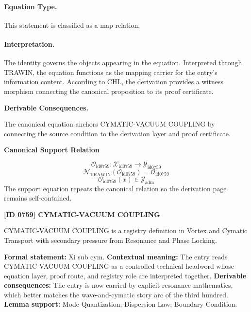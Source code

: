 \paragraph{Equation Type.}
This statement is classified as a map relation.

\paragraph{Interpretation.}
The identity governs the objects appearing in the equation. Interpreted through TRAWIN, the equation functions as the mapping carrier for the entry’s information content. According to CHL, the derivation provides a witness morphism connecting the canonical proposition to its proof certificate.

\par\vspace{0.35em}
\noindent\textbf{Derivable Consequences.}\quad
\begingroup
\footnotesize
\raggedright
The canonical equation anchors CYMATIC-VACUUM COUPLING by connecting the source condition to the derivation layer and proof certificate.
\par\endgroup

\noindent\textbf{Canonical Support Relation}\par
\[
\mathcal{O}_{\mathrm{id0759}}:\mathcal{X}_{\mathrm{id0759}}\longrightarrow\mathcal{Y}_{\mathrm{id0759}}
\]
\[
\mathcal{N}_{\mathrm{TRAWIN}}(\mathcal{O}_{\mathrm{id0759}})=\mathcal{O}_{\mathrm{id0759}}
\]
\[
\mathcal{O}_{\mathrm{id0759}}(x)\in\mathcal{Y}_{\mathrm{adm}}
\]
\noindent The support equation repeats the canonical relation so the derivation page remains self-contained.\par

\clearpage
\noindent\textbf{[ID 0759] CYMATIC-VACUUM COUPLING}\par
\vspace{0.35em}
\begingroup\small
{}
CYMATIC-VACUUM COUPLING is a registry definition in Vortex and Cymatic Transport with secondary pressure from Resonance and Phase Locking.

\begingroup\footnotesize\setlength{\emergencystretch}{3em}\sloppy
\textbf{Formal statement:} Xi sub cym. \textbf{Contextual meaning:} The entry reads CYMATIC-VACUUM COUPLING as a controlled technical headword whose equation layer, proof route, and registry role are interpreted together. \textbf{Derivable consequences:} The entry is now carried by explicit resonance mathematics, which better matches the wave-and-cymatic story arc of the third hundred. \textbf{Lemma support:} Mode Quantization; Dispersion Law; Boundary Condition.\par
\endgroup

